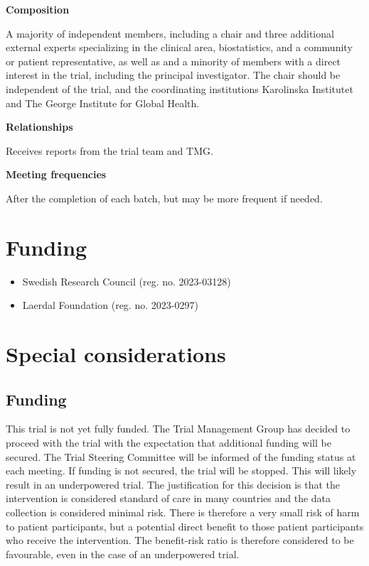 \documentclass[
]{scrartcl}
\providecommand{\tightlist}{%
  \setlength{\itemsep}{0pt}\setlength{\parskip}{0pt}}\usepackage{longtable,booktabs,array}
\begin{document}
\textbf{Composition}

A majority of independent members, including a chair and three
additional external experts specializing in the clinical area,
biostatistics, and a community or patient representative, as well as and
a minority of members with a direct interest in the trial, including the
principal investigator. The chair should be independent of the trial,
and the coordinating institutions Karolinska Institutet and The George
Institute for Global Health.

\textbf{Relationships}

Receives reports from the trial team and TMG.

\textbf{Meeting frequencies}

After the completion of each batch, but may be more frequent if needed.

\hypertarget{funding}{%
\section{Funding}\label{funding}}

\begin{itemize}
\tightlist
\item
  Swedish Research Council (reg. no. 2023-03128)
\item
  Laerdal Foundation (reg. no. 2023-0297)
\end{itemize}

\hypertarget{special-considerations}{%
\section{Special considerations}\label{special-considerations}}

\hypertarget{funding-1}{%
\subsection{Funding}\label{funding-1}}

This trial is not yet fully funded. The Trial Management Group has
decided to proceed with the trial with the expectation that additional
funding will be secured. The Trial Steering Committee will be informed
of the funding status at each meeting. If funding is not secured, the
trial will be stopped. This will likely result in an underpowered trial.
The justification for this decision is that the intervention is
considered standard of care in many countries and the data collection is
considered minimal risk. There is therefore a very small risk of harm to
patient participants, but a potential direct benefit to those patient
participants who receive the intervention. The benefit-risk ratio is
therefore considered to be favourable, even in the case of an
underpowered trial.
\end{document}
